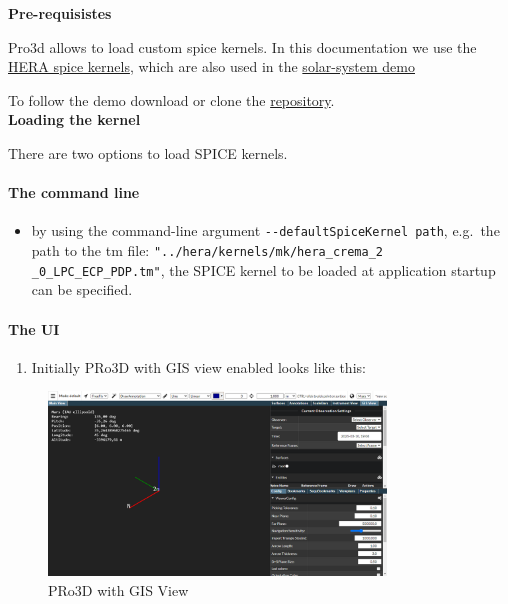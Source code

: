\hypertarget{pre-requisistes}{%
	\textbf{Pre-requisistes}\label{pre-requisistes}}

Pro3d allows to load custom spice kernels. In this documentation we use the
\href{https://s2e2.cosmos.esa.int/bitbucket/projects/spice_kernels/repos/hera/browse}{HERA
	spice kernels}, which are also used in the
\href{https://github.com/pro3d-space/PRo3D.SPICE}{solar-system demo}

To follow the demo download or clone the
\href{https://s2e2.cosmos.esa.int/bitbucket/projects/spice_kernels/repos/hera/browse}{repository}.\\

\hypertarget{loading-the-kernel}{%
	\textbf{Loading the kernel}\label{loading-the-kernel}}

There are two options to load SPICE kernels.

\hypertarget{the-command-line}{%
	\paragraph{The command line}\label{the-command-line}}

\begin{itemize}
	\tightlist
	\item
	by using the command-line argument
	\texttt{-\/-defaultSpiceKernel\ path}, e.g.~the path to the tm file:
	\texttt{"../hera/kernels/mk/hera\_crema\_2 \_0\_LPC\_ECP\_PDP.tm"}, the
	SPICE kernel to be loaded at application startup can be specified.
\end{itemize}

\newpage

\hypertarget{the-ui}{%
	\paragraph{The UI}\label{the-ui}}

\begin{enumerate}
	\def\labelenumi{\arabic{enumi}.}
	\tightlist
	\item
	Initially PRo3D with GIS view enabled looks like this:
\end{enumerate}

\begin{figure}[h!]
	\centering
	\includegraphics[width=0.8\textwidth]{./pics/gis-view.png}
	\caption{PRo3D with GIS View}
\end{figure}

